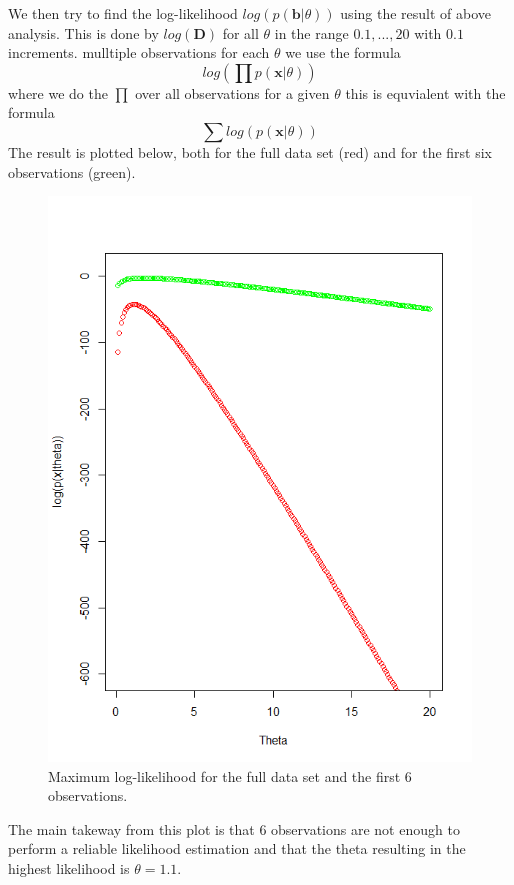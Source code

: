 \documentclass[a4paper,12pt]{article}
\begin{document}
We then try to find the log-likelihood \(log(p(\textbf{b} | \theta))\) using the result of above analysis. This is done by \( log( \mathbf{D} )\) for all \(\theta\) in the range \(0.1,...,20\) with \(0.1\) increments. mulltiple observations for each \( \theta \) we use the formula 
\begin{equation}
  log( \prod p(\mathbf{x} |\theta))
\end{equation}
where we do the \( \prod \) over all observations for a given \(\theta\) this is equvialent with the formula
\begin{equation}
  \sum{log(p(\mathbf{x} |\theta))}
\end{equation}
The result is plotted below, both for the full data set (red) and for the first six observations (green).
\begin{figure}[H]
\centering
\begin{minipage}[]{0.5\textwidth}
  \includegraphics[width=\textwidth]{figures/Lab1_A2_ll_and_ll6.png}  
  \caption{Maximum log-likelihood for the full data set and the first 6 observations.\label{fig:Maximum log-likelihood for the full data set and the first 6 observations} }
 \end{minipage}
\end{figure}
The main takeway from this plot is that 6 observations are not enough to perform a reliable likelihood estimation and that the theta resulting in the highest likelihood is \(\theta = 1.1\).
\end{document}
